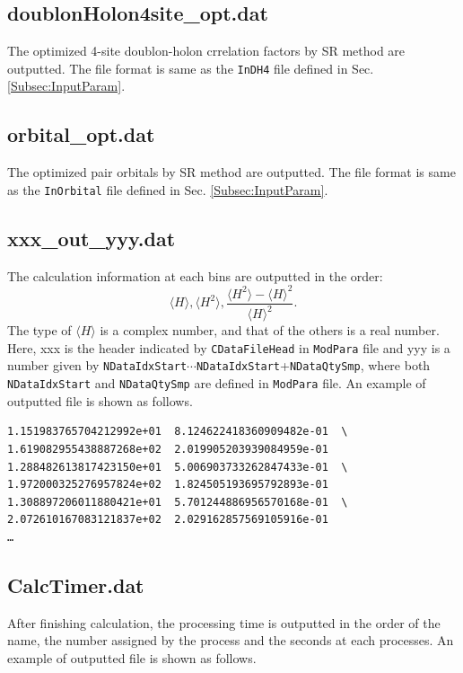 \subsection{doublonHolon4site\_opt.dat}
The optimized 4-site doublon-holon crrelation factors  by SR method are outputted. The file format is same as the \verb|InDH4| file defined in Sec. \ref{Subsec:InputParam}.

\subsection{orbital\_opt.dat}
The optimized pair orbitals by SR method are outputted. The file format is same as the \verb|InOrbital| file defined in Sec. \ref{Subsec:InputParam}.

\subsection{xxx\_out\_yyy.dat}
The calculation information at each bins are outputted in the order:
\begin{equation}
\langle H \rangle, \langle H^2 \rangle, \frac{\langle H^2 \rangle- \langle H \rangle^2 }{\langle H \rangle^2} \nonumber.
\end{equation}
The type of $\langle H \rangle$ is a complex number, and that of the others is a real number.
Here, xxx is the header indicated by \verb|CDataFileHead| in \verb|ModPara| file and yyy is a number given by \verb|NDataIdxStart|$\cdots$\verb|NDataIdxStart|+\verb|NDataQtySmp|, where both \verb|NDataIdxStart| and \verb|NDataQtySmp| are defined in \verb|ModPara| file.
An example of outputted file is shown as follows.

\begin{minipage}{13cm}
\begin{screen}
\begin{verbatim}
1.151983765704212992e+01  8.124622418360909482e-01  \
1.619082955438887268e+02  2.019905203939084959e-01 
1.288482613817423150e+01  5.006903733262847433e-01  \ 
1.972000325276957824e+02  1.824505193695792893e-01
1.308897206011880421e+01  5.701244886956570168e-01  \
2.072610167083121837e+02  2.029162857569105916e-01
…
\end{verbatim}
\end{screen}
\end{minipage}

\subsection{CalcTimer.dat }
After finishing calculation, the processing time is outputted in the order of the name, the number assigned by the process and the seconds at each processes. An example of outputted file is shown as follows.

